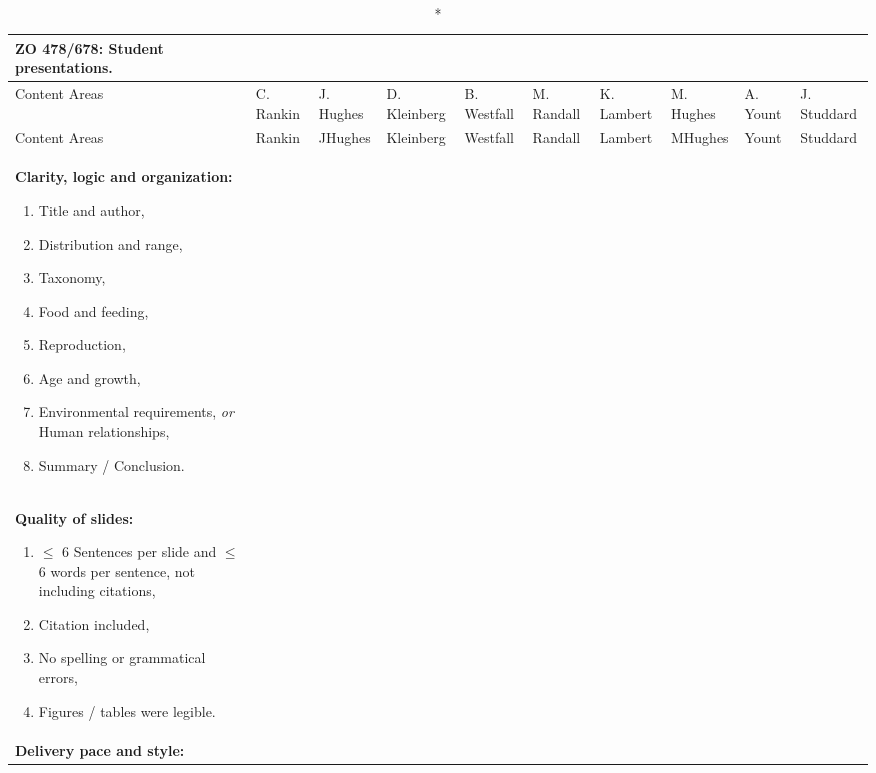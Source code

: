 \documentclass[10pt, twoside]{article}
\begin{document}
\begin{landscape}
{\small%
\begin{longtable}[l]{@{}L{5cm}|C{1.6cm}|C{1.6cm}|C{1.6cm}|C{1.6cm}|C{1.6cm}|C{1.6cm}|C{1.6cm}|C{1.6cm}|C{1.6cm}|@{}}
\caption*{\textbf{ZO 478/678: Student presentations.}}\\
\toprule
Content Areas & C.\,Rankin & J.\,Hughes & D.\,Kleinberg & B.\,Westfall & M.\,Randall & K.\,Lambert & M.\,Hughes & A.\,Yount & J.\,Studdard\\ 
\midrule
\endfirsthead
\toprule
Content Areas & Rankin & JHughes & Kleinberg & Westfall & Randall & Lambert & MHughes & Yount & Studdard\\ 
\midrule
\endhead
\textbf{Clarity, logic  and organization:}\par%
\vspace{-0.5\baselineskip}
\begin{enumerate}[itemsep=-0.25\baselineskip,align=left, leftmargin=*]
\item Title and author,
\item Distribution and range,
\item Taxonomy,
\item Food and feeding,
\item Reproduction,
\item Age and growth,
\item Environmental requirements, \emph{or}
Human relationships,
\item Summary / Conclusion.
\end{enumerate}&%
& & & & & & & &\\[-1em]
\midrule
\textbf{Quality of slides:}\par%
\vspace{-0.5\baselineskip}
\begin{enumerate}[itemsep=-0.25\baselineskip,align=left, leftmargin=*]
\item $\leq$ 6 Sentences per slide and $\leq$ 6 words per sentence, not including citations, %
\item Citation included, \par%
\item No spelling or grammatical errors,\par%
\item Figures / tables were legible.\end{enumerate}&%
& & & & & & & &\\[-1em]
\midrule
\textbf{Delivery pace and style:}\par%
\vspace{-0.5\baselineskip}

\end{longtable}}
\end{landscape}
\end{document}
